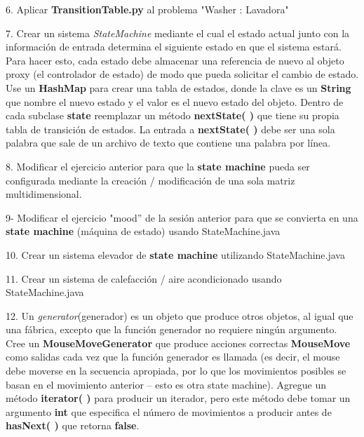 6. Aplicar \textbf{TransitionTable.py} al problema "Washer : Lavadora"  \newline

7. Crear un sistema \textit{StateMachine} mediante el cual el estado actual junto con la información de entrada determina el siguiente estado en que el sistema estará. Para hacer esto, cada estado debe almacenar una referencia de nuevo al objeto proxy (el controlador de estado) de modo que pueda solicitar el cambio de estado. Use un \textbf{HashMap} para crear una tabla de estados, donde la clave es un \textbf{String} que nombre el nuevo estado y el valor es el nuevo estado del objeto. Dentro de cada subclase \textbf{state} reemplazar un método \textbf{nextState( )} que tiene su propia tabla de transición de estados. La entrada a \textbf{nextState( )} debe ser una sola palabra que sale de un archivo de texto que contiene una palabra por línea.  \newline

8. Modificar el ejercicio anterior para que la \textbf{state machine} pueda ser configurada mediante la creación / modificación de una sola matriz multidimensional. \newline

9- Modificar el ejercicio  "mood” de la sesión anterior para que se convierta en una  \textbf{state machine} (máquina de estado) usando StateMachine.java     \newline

10. Crear un sistema elevador de \textbf{state machine} utilizando StateMachine.java     \newline

11. Crear un sistema de calefacción / aire acondicionado usando StateMachine.java   \newline

12. Un \textit{generator}(generador) es un objeto que produce otros objetos, al igual que una fábrica, excepto que la función generador no requiere ningún argumento. Cree un \textbf{MouseMoveGenerator} que produce acciones correctas \textbf{MouseMove} como salidas cada vez que la función generador es llamada (es decir, el mouse debe moverse en la secuencia apropiada, por lo que los movimientos posibles se basan en el movimiento anterior – esto es otra state machine). Agregue un método \textbf{iterator( )} para producir un iterador, pero este método debe tomar un argumento  \textbf{int} que especifica el número de movimientos a producir antes de \textbf{hasNext( )} que retorna \textbf{false}.
